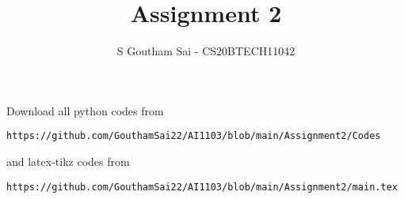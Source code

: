 \documentclass[journal,12pt,twocolumn]{IEEEtran}
\DeclareMathOperator*{\Res}{Res}
\begin{document}
\newcommand{\BEQA}{\begin{eqnarray}}
\newcommand{\EEQA}{\end{eqnarray}}
\newcommand{\define}{\stackrel{\triangle}{=}}

\raggedbottom
\setlength{\parindent}{0pt}
\providecommand{\mbf}{\mathbf}
\providecommand{\pr}[1]{\ensuremath{\Pr\left(#1\right)}}
\providecommand{\qfunc}[1]{\ensuremath{Q\left(#1\right)}}
\providecommand{\sbrak}[1]{\ensuremath{{}\left[#1\right]}}
\providecommand{\lsbrak}[1]{\ensuremath{{}\left[#1\right.}}
\providecommand{\rsbrak}[1]{\ensuremath{{}\left.#1\right]}}
\providecommand{\brak}[1]{\ensuremath{\left(#1\right)}}
\providecommand{\lbrak}[1]{\ensuremath{\left(#1\right.}}
\providecommand{\rbrak}[1]{\ensuremath{\left.#1\right)}}
\providecommand{\cbrak}[1]{\ensuremath{\left\{#1\right\}}}
\providecommand{\lcbrak}[1]{\ensuremath{\left\{#1\right.}}
\providecommand{\rcbrak}[1]{\ensuremath{\left.#1\right\}}}
\theoremstyle{remark}
\newtheorem{rem}{Remark}
\newtheorem{lemma}{Question}
\newcommand{\sgn}{\mathop{\mathrm{sgn}}}
\providecommand{\abs}[1]{\vert#1\vert}
\providecommand{\res}[1]{\Res\displaylimits_{#1}} 
\providecommand{\norm}[1]{\lVert#1\rVert}
\providecommand{\mtx}[1]{\mathbf{#1}}
\providecommand{\mean}[1]{E[ #1 ]}
\providecommand{\fourier}{\overset{\mathcal{F}}{ \rightleftharpoons}}
\providecommand{\system}{\overset{\mathcal{H}}{ \longleftrightarrow}}
\newcommand{\solution}{\noindent \textbf{Solution: }}
\newcommand{\cosec}{\,\text{cosec}\,}
\providecommand{\dec}[2]{\ensuremath{\overset{#1}{\underset{#2}{\gtrless}}}}
\newcommand{\myvec}[1]{\ensuremath{\begin{pmatrix}#1\end{pmatrix}}}
\newcommand{\mydet}[1]{\ensuremath{\begin{vmatrix}#1\end{vmatrix}}}
\makeatletter
{}
\makeatother
\let\StandardTheFigure\thefigure
\let\vec\mathbf
\renewcommand{\thefigure}{\theproblem}
\def\putbox#1#2#3{\makebox[0in][l]{\makebox[#1][l]{}\raisebox{\baselineskip}[0in][0in]{\raisebox{#2}[0in][0in]{#3}}}}
     \def\rightbox#1{\makebox[0in][r]{#1}}
     \def\centbox#1{\makebox[0in]{#1}}
     \def\topbox#1{\raisebox{-\baselineskip}[0in][0in]{#1}}
     \def\midbox#1{\raisebox{-0.5\baselineskip}[0in][0in]{#1}}
\vspace{3cm}
\title{Assignment 2}
\author{S Goutham Sai - CS20BTECH11042}
\maketitle
\newpage
\bigskip
\renewcommand{\thefigure}{\theenumi}
\renewcommand{\thetable}{\theenumi}
Download all python codes from 
\begin{lstlisting}
https://github.com/GouthamSai22/AI1103/blob/main/Assignment2/Codes
\end{lstlisting}
%
and latex-tikz codes from 
%
\begin{lstlisting}
https://github.com/GouthamSai22/AI1103/blob/main/Assignment2/main.tex
\end{lstlisting}
\end{document}
